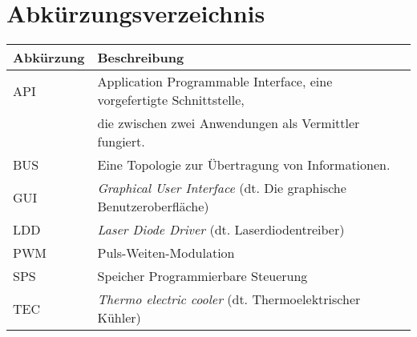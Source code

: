 \section*{Abkürzungsverzeichnis}

\begin{table}[H]
    \begin{tabular}{l|l}
         \textbf{Abkürzung}& \textbf{Beschreibung}\\
         \hline
         API&   Application Programmable Interface, eine vorgefertigte Schnittstelle,\\
         &      die zwischen zwei Anwendungen als Vermittler fungiert.\\
         BUS&   Eine Topologie zur Übertragung von Informationen.\\         
         GUI&   \textit{Graphical User Interface} (dt. Die graphische Benutzeroberfläche)\\
         LDD&   \textit{Laser Diode Driver} (dt. Laserdiodentreiber)\\
         PWM&   Puls-Weiten-Modulation\\         
         SPS&   Speicher Programmierbare Steuerung\\
         TEC&   \textit{Thermo electric cooler} (dt. Thermoelektrischer Kühler)\\
    \end{tabular}
    \label{tab:abkuerzungen}
\end{table}


